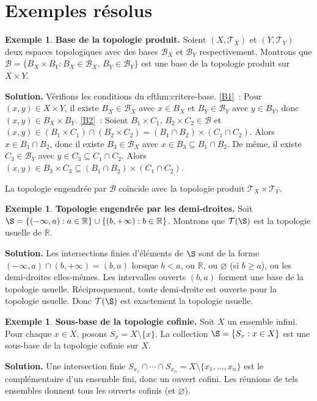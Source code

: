 \documentclass[12pt,a4paper,openany]{book}
\theoremstyle{definition}
\theoremstyle{cours}
\theoremstyle{coursnormal}
\newtheorem{exemple}[theoreme]{Exemple}
\newcommand{\R}{\mathbb{R}}
\newcommand{\T}{\mathcal{T}}
\newcommand{\B}{\mathcal{B}}
\begin{document}
\section{Exemples résolus}\label{sec:exemples-resolus-ch3}

\begin{exemple}\label{ex:base-produit}
  \textbf{Base de la topologie produit.}
  Soient $(X,\T_X)$ et $(Y,\T_Y)$ deux espaces topologiques avec des bases
  $\B_X$ et $\B_Y$ respectivement. Montrons que
  $\B = \{B_X\times B_Y : B_X\in\B_X,\, B_Y\in\B_Y\}$ est une base de la
  topologie produit sur $X\times Y$.

  \textbf{Solution.} Vérifions les conditions du 
ef{thm:critere-base}.
  \ref{B1}~: Pour $(x,y)\in X\times Y$, il existe $B_X\in\B_X$ avec
  $x\in B_X$ et $B_Y\in\B_Y$ avec $y\in B_Y$, donc
  $(x,y)\in B_X\times B_Y$. \ref{B2}~: Soient
  $B_1\times C_1,\, B_2\times C_2\in\B$ et
  $(x,y)\in (B_1\times C_1)\cap(B_2\times C_2) = (B_1\cap B_2)\times(C_1\cap C_2)$.
  Alors $x\in B_1\cap B_2$, donc il existe $B_3\in\B_X$ avec
  $x\in B_3\subseteq B_1\cap B_2$. De même, il existe $C_3\in\B_Y$ avec
  $y\in C_3\subseteq C_1\cap C_2$. Alors
  $(x,y)\in B_3\times C_3\subseteq (B_1\cap B_2)\times(C_1\cap C_2)$.

  La topologie engendrée par $\B$ coïncide avec la topologie produit
  $\T_X\times\T_Y$.
\end{exemple}

\begin{exemple}\label{ex:topo-engendree-R}
  \textbf{Topologie engendrée par les demi-droites.}
  Soit $\S = \{(-\infty,a) : a\in\R\}\cup\{(b,+\infty) : b\in\R\}$. Montrons
  que $\T(\S)$ est la topologie usuelle de $\R$.

  \textbf{Solution.} Les intersections finies d'éléments de $\S$ sont de la
  forme $(-\infty,a)\cap(b,+\infty)=(b,a)$ lorsque $b<a$, ou $\R$, ou
  $\varnothing$ (si $b\geq a$), ou les demi-droites elles-mêmes. Les
  intervalles ouverts $(b,a)$ forment une base de la topologie usuelle.
  Réciproquement, toute demi-droite est ouverte pour la topologie usuelle.
  Donc $\T(\S)$ est exactement la topologie usuelle.
\end{exemple}

\begin{exemple}\label{ex:sousbase-cofinite}
  \textbf{Sous-base de la topologie cofinie.}
  Soit $X$ un ensemble infini. Pour chaque $x\in X$, posons
  $S_x = X\setminus\{x\}$. La collection $\S=\{S_x : x\in X\}$ est une
  sous-base de la topologie cofinie sur $X$.

  \textbf{Solution.} Une intersection finie $S_{x_1}\cap\cdots\cap S_{x_n}
  = X\setminus\{x_1,\ldots,x_n\}$ est le complémentaire d'un ensemble fini,
  donc un ouvert cofini. Les réunions de tels ensembles donnent tous les
  ouverts cofinis (et $\varnothing$).
\end{exemple}
\end{document}
